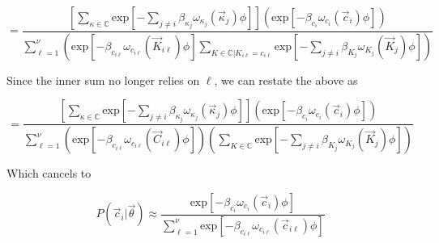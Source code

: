 \documentclass[11pt]{article} %
\begin{document}
\[
=
\frac{
\left[
\sum _{\kappa \in \mathbb{C}}
\mbox{exp}\left[-\sum_{j\neq i} \beta_{\kappa_j} \omega_{\kappa_j} (\vec{\kappa}_j) \phi \right]
\right]
\left(\mbox{exp}\left[-\beta_{c_i} \omega_{c_i} (\vec{c}_i) \phi \right]\right)
}{
\sum_{\ell=1}^\nu
\left(
\mbox{exp}\left[-\beta_{c_{i\ell}} \omega_{c_{i\ell}} (\vec{K}_{i\ell}) \phi \right]
\sum _{K \in \mathbb{C} | K_{i\ell} = c_{i\ell}}
\mbox{exp}\left[-\sum_{j\neq i} \beta_{K_j} \omega_{K_j} (\vec{K}_j) \phi \right]
\right)
}
\]

Since the inner sum no longer relies on $\ell$, we can restate the above as 

\[
=
\frac{
\left[
\sum _{\kappa \in \mathbb{C}}
\mbox{exp}\left[-\sum_{j\neq i} \beta_{\kappa_j} \omega_{\kappa_j} (\vec{\kappa}_j) \phi \right]
\right]
\left(\mbox{exp}\left[-\beta_{c_i} \omega_{c_i} (\vec{c}_i) \phi \right]\right)
}{
\sum_{\ell=1}^\nu
\left(
\mbox{exp}\left[-\beta_{c_{i\ell}} \omega_{c_{i\ell}} (\vec{C}_{i\ell}) \phi \right]
\right)\left(
\sum _{K \in \mathbb{C}}
\mbox{exp}\left[-\sum_{j\neq i} \beta_{K_j} \omega_{K_j} (\vec{K}_j) \phi \right]
\right)
}
\]


Which cancels to


\[
P(\vec{c}_i | \vec{\theta})
\approx
\frac{
\mbox{exp}\left[-\beta_{c_i} \omega_{c_i} (\vec{c}_i) \phi \right]
}{
\sum_{\ell=1}^\nu
\mbox{exp}\left[-\beta_{c_{i\ell}} \omega_{c_{i\ell}} (\vec{c}_{i\ell}) \phi \right]
}
\]

%
\end{document}
